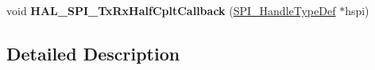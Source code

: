 \begin{DoxyCompactItemize}
\item 
void {\bfseries H\+A\+L\+\_\+\+S\+P\+I\+\_\+\+Tx\+Rx\+Half\+Cplt\+Callback} (\hyperlink{group___s_p_i___exported___types_gab633e49dd034de2f3a1fe79853d78d18}{S\+P\+I\+\_\+\+Handle\+Type\+Def} $\ast$hspi)\hypertarget{group___s_p_i___exported___functions___group2_gab46e2325b0880d5b5a301792438b151b}{}\label{group___s_p_i___exported___functions___group2_gab46e2325b0880d5b5a301792438b151b}

\end{DoxyCompactItemize}


\subsection{Detailed Description}
